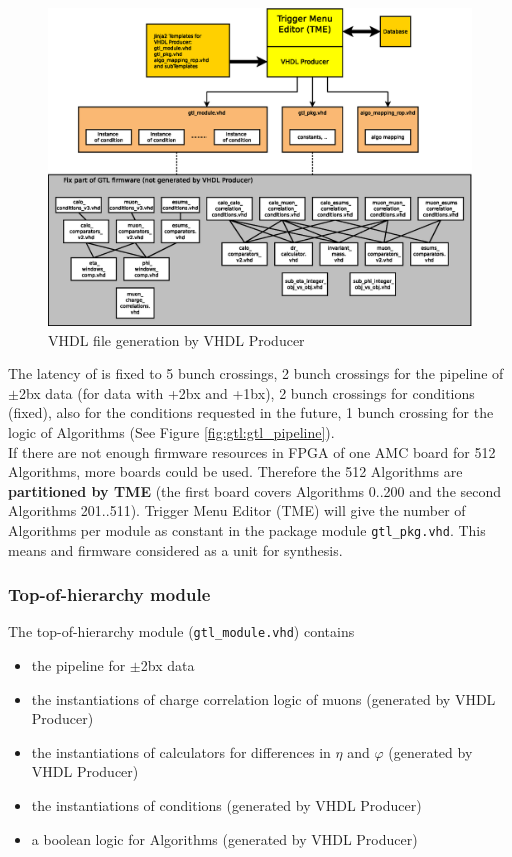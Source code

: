 \begin{figure}[htb]
\centering
\includegraphics[width=15cm]{figures/tme_gtl}
\caption{VHDL file generation by VHDL Producer} 
\label{fig:gtl:tme_gtl}
\end{figure}

The latency of \ugtl is fixed to 5 bunch crossings,
2 bunch crossings for the pipeline of $\pm$2bx data (for data with +2bx and +1bx), 2 bunch crossings for conditions (fixed), also for the conditions requested in the future,
1 bunch crossing for the logic of Algorithms (See Figure \ref{fig:gtl:gtl_pipeline}).\\

If there are not enough firmware resources in FPGA of one AMC board for 512 Algorithms, more boards could be used. Therefore the 512 Algorithms are \textbf{partitioned by TME} (\eg the first board covers
Algorithms 0..200 and the second Algorithms 201..511). Trigger Menu Editor (TME) will give the number of Algorithms per module as constant in the package module \texttt{gtl\_pkg.vhd}.
This means \ugtl and \ufdl firmware considered as a unit for synthesis.\\

\subsubsection{Top-of-hierarchy module}
\label{sec:gtl:top_module}

The top-of-hierarchy module (\texttt{gtl\_module.vhd}) contains 
\begin {itemize}
\item the pipeline for $\pm$2bx data
\item the instantiations of charge correlation logic of muons (generated by VHDL Producer)
\item the instantiations of calculators for differences in $\eta$ and $\varphi$ (generated by VHDL Producer)
\item the instantiations of conditions (generated by VHDL Producer)
\item a boolean logic for Algorithms (generated by VHDL Producer)
\end {itemize}

